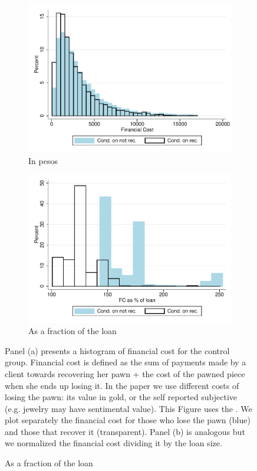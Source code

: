 \documentclass[11pt]{article}
\begin{document}
\begin{figure}[H]
     \caption{Financial cost}
    \label{fc_hist}
    \begin{center}
    \begin{subfigure}{.45\textwidth}
      \caption{In pesos}
        \centering
        \includegraphics[width=\textwidth]{Figuras/hist_fc.pdf}
    \end{subfigure}
    \begin{subfigure}{0.45\textwidth}
    \caption{As a fraction of the loan}
       \centering
      \includegraphics[width=\textwidth]{Figuras/hist_fc_perc_loan.pdf}
    \end{subfigure}
    \end{center}
         \scriptsize
         Panel (a) presents a histogram of financial cost for the control group. Financial cost is defined as the sum of payments made by a client towards recovering her pawn + the cost of the pawned piece when she ends up losing it. In the paper we use different costs of losing the pawn: its value in gold, or the self reported subjective (e.g. jewelry may have sentimental value). This Figure uses the . We plot separately the financial cost for those who lose the pawn (blue) and those that recover it (transparent).  Panel (b) is analogous but we normalized the financial cost dividing it by the loan size.  %

\end{figure}
\end{document}

